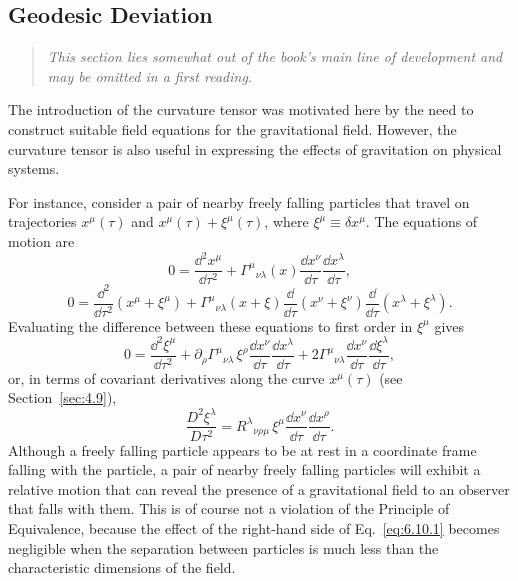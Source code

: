 
\subsection{Geodesic Deviation\optionalreading}\label{sec:6.10}

\begin{quote}
\small\emph{This section lies somewhat out of the book's main line of
development and may be omitted in a first reading.}
\end{quote}

The introduction of the curvature tensor was motivated here by the need to
construct suitable field equations for the gravitational field. However, the
curvature tensor is also useful in expressing the effects of gravitation on
physical systems.

For instance, consider a pair of nearby freely falling particles that travel
on trajectories \(x^\mu(\tau)\) and
\(x^\mu(\tau)+\xi^\mu(\tau)\), where
\(\xi^\mu\equiv\delta x^\mu\). The equations of motion are
\[
  0
  =
  \frac{\dd^2x^\mu}{\dd\tau^2}
  +\Gamma^\mu{}_{\nu\lambda}(x)
   \frac{\dd x^\nu}{\dd\tau}
   \frac{\dd x^\lambda}{\dd\tau},
\]
\[
  0
  =
  \frac{\dd^2}{\dd\tau^2}(x^\mu+\xi^\mu)
  +\Gamma^\mu{}_{\nu\lambda}(x+\xi)
   \frac{\dd}{\dd\tau}(x^\nu+\xi^\nu)
   \frac{\dd}{\dd\tau}(x^\lambda+\xi^\lambda).
\]
Evaluating the difference between these equations to first order in
\(\xi^\mu\) gives
\[
  0
  =
  \frac{\dd^2\xi^\mu}{\dd\tau^2}
  +\partial_\rho\Gamma^\mu{}_{\nu\lambda}\,
   \xi^\rho
   \frac{\dd x^\nu}{\dd\tau}
   \frac{\dd x^\lambda}{\dd\tau}
  +2\Gamma^\mu{}_{\nu\lambda}
   \frac{\dd x^\nu}{\dd\tau}
   \frac{\dd\xi^\lambda}{\dd\tau},
\]
or, in terms of covariant derivatives along the curve \(x^\mu(\tau)\) (see
Section~\ref{sec:4.9}),
\begin{equation}
  \frac{D^2\xi^\lambda}{D\tau^2}
  =
  R^\lambda{}_{\nu\rho\mu}\,
  \xi^\mu
  \frac{\dd x^\nu}{\dd\tau}
  \frac{\dd x^\rho}{\dd\tau}.
  \tag{6.10.1}\label{eq:6.10.1}
\end{equation}
Although a freely falling particle appears to be at rest in a coordinate
frame falling with the particle, a pair of nearby freely falling particles
will exhibit a relative motion that can reveal the presence of a
gravitational field to an observer that falls with them. This is of course
not a violation of the Principle of Equivalence, because the effect of the
right-hand side of Eq.~\eqref{eq:6.10.1} becomes negligible when the
separation between particles is much less than the characteristic dimensions
of the field.
